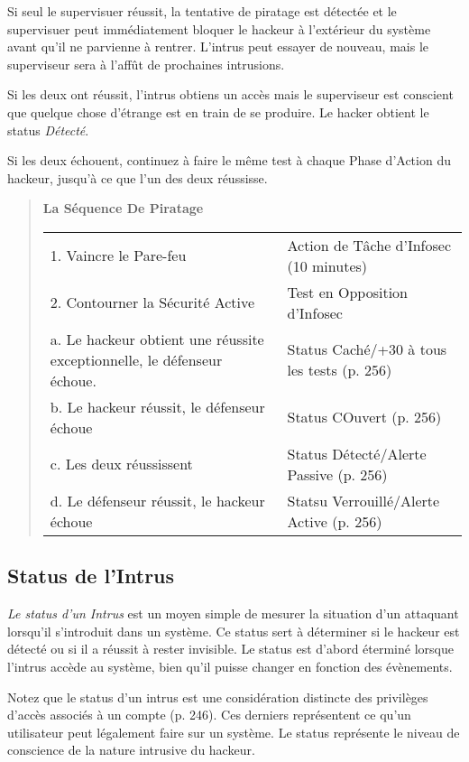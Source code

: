 Si seul le supervisuer réussit, la tentative de piratage est détectée et le supervisuer peut immédiatement bloquer le hackeur à l'extérieur du système avant qu'il ne parvienne à rentrer. L'intrus peut essayer de nouveau, mais le superviseur sera à l'affût de prochaines intrusions. 

Si les deux ont réussit, l'intrus obtiens un accès mais le superviseur est conscient que quelque chose d'étrange est en train de se produire. Le hacker obtient le status \textit{Détecté}. 

Si les deux échouent, continuez à faire le même test à chaque Phase d'Action du hackeur, jusqu'à ce que l'un des deux réussisse. 

\begin{quotation} \textbf{La Séquence De Piratage} 

\begin{tabular}{ll} 1. Vaincre le Pare-feu &Action de Tâche d'Infosec (10 minutes) \\ 2. Contourner la Sécurité Active &Test en Opposition d'Infosec \\ \indent a. Le hackeur obtient une réussite exceptionnelle, le défenseur échoue. &Status Caché/+30 à tous les tests (p. 256) \\ \indent b. Le hackeur réussit, le défenseur échoue &Status COuvert (p. 256) \\ \indent c. Les deux réussissent &Status Détecté/Alerte Passive (p. 256) \\ \indent d. Le défenseur réussit, le hackeur échoue &Statsu Verrouillé/Alerte Active (p. 256) \\ \end{tabular} \end{quotation} 

\subsection{Status de l'Intrus} 

\textit{Le status d'un Intrus} est un moyen simple de mesurer la situation d'un attaquant lorsqu'il s'introduit dans un système. Ce status sert à déterminer si le hackeur est détecté ou si il a réussit à rester invisible. Le status est d'abord éterminé lorsque l'intrus accède au système, bien qu'il puisse changer en fonction des évènements. 

Notez que le status d'un intrus est une considération distincte des privilèges d'accès associés à un compte (p. 246). Ces derniers représentent ce qu'un utilisateur peut légalement faire sur un système. Le status représente le niveau de conscience de la nature intrusive du hackeur. 

